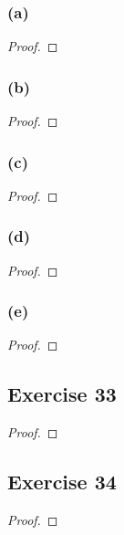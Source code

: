 \documentclass[14pt]{extarticle}
\begin{document}
\subsubsection{(a)}

\begin{proof}

\end{proof}

\subsubsection{(b)}

\begin{proof}

\end{proof}

\subsubsection{(c)}

\begin{proof}

\end{proof}

\subsubsection{(d)}

\begin{proof}

\end{proof}

\subsubsection{(e)}

\begin{proof}

\end{proof}

\subsection{Exercise 33}

\begin{proof}

\end{proof}

\subsection{Exercise 34}

\begin{proof}

\end{proof}
\end{document}
